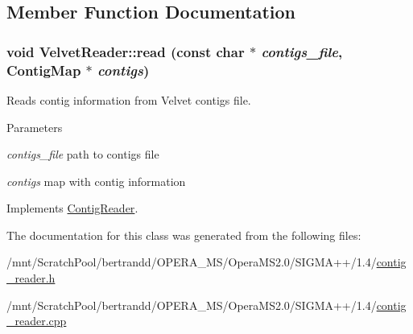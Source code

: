 \subsection{Member Function Documentation}
\hypertarget{classVelvetReader_a0121c85cb0fefcc3f0c52f134756ed2e}{
\subsubsection[{read}]{\setlength{\rightskip}{0pt plus 5cm}void VelvetReader::read (const char $\ast$ {\em contigs\_\-file}, \/  {\bf ContigMap} $\ast$ {\em contigs})}}
\label{classVelvetReader_a0121c85cb0fefcc3f0c52f134756ed2e}


Reads contig information from Velvet contigs file. 
\begin{DoxyParams}{Parameters}
\item[{\em contigs\_\-file}]path to contigs file \item[{\em contigs}]map with contig information \end{DoxyParams}
 

Implements \hyperlink{classContigReader_a935b5918388b7009b36e639391cfa4e8}{ContigReader}.

The documentation for this class was generated from the following files:\begin{DoxyCompactItemize}
\item 
/mnt/ScratchPool/bertrandd/OPERA\_\-MS/OperaMS2.0/SIGMA++/1.4/\hyperlink{contig__reader_8h}{contig\_\-reader.h}\item 
/mnt/ScratchPool/bertrandd/OPERA\_\-MS/OperaMS2.0/SIGMA++/1.4/\hyperlink{contig__reader_8cpp}{contig\_\-reader.cpp}\end{DoxyCompactItemize}
